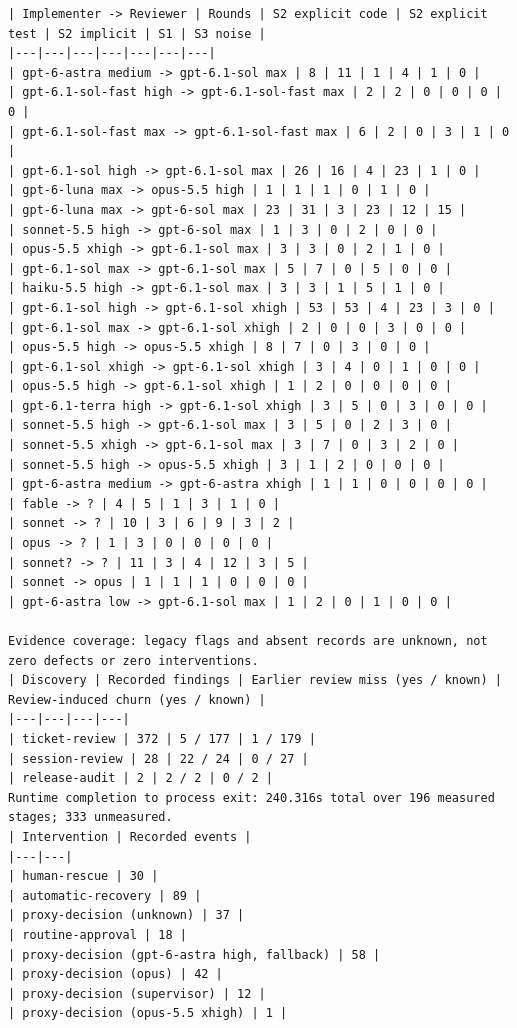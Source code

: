 \documentclass[11pt,a4paper]{article}
\begin{document}
{\begin{verbatim}
| Implementer -> Reviewer | Rounds | S2 explicit code | S2 explicit test | S2 implicit | S1 | S3 noise |
|---|---|---|---|---|---|---|
| gpt-6-astra medium -> gpt-6.1-sol max | 8 | 11 | 1 | 4 | 1 | 0 |
| gpt-6.1-sol-fast high -> gpt-6.1-sol-fast max | 2 | 2 | 0 | 0 | 0 | 0 |
| gpt-6.1-sol-fast max -> gpt-6.1-sol-fast max | 6 | 2 | 0 | 3 | 1 | 0 |
| gpt-6.1-sol high -> gpt-6.1-sol max | 26 | 16 | 4 | 23 | 1 | 0 |
| gpt-6-luna max -> opus-5.5 high | 1 | 1 | 1 | 0 | 1 | 0 |
| gpt-6-luna max -> gpt-6-sol max | 23 | 31 | 3 | 23 | 12 | 15 |
| sonnet-5.5 high -> gpt-6-sol max | 1 | 3 | 0 | 2 | 0 | 0 |
| opus-5.5 xhigh -> gpt-6.1-sol max | 3 | 3 | 0 | 2 | 1 | 0 |
| gpt-6.1-sol max -> gpt-6.1-sol max | 5 | 7 | 0 | 5 | 0 | 0 |
| haiku-5.5 high -> gpt-6.1-sol max | 3 | 3 | 1 | 5 | 1 | 0 |
| gpt-6.1-sol high -> gpt-6.1-sol xhigh | 53 | 53 | 4 | 23 | 3 | 0 |
| gpt-6.1-sol max -> gpt-6.1-sol xhigh | 2 | 0 | 0 | 3 | 0 | 0 |
| opus-5.5 high -> opus-5.5 xhigh | 8 | 7 | 0 | 3 | 0 | 0 |
| gpt-6.1-sol xhigh -> gpt-6.1-sol xhigh | 3 | 4 | 0 | 1 | 0 | 0 |
| opus-5.5 high -> gpt-6.1-sol xhigh | 1 | 2 | 0 | 0 | 0 | 0 |
| gpt-6.1-terra high -> gpt-6.1-sol xhigh | 3 | 5 | 0 | 3 | 0 | 0 |
| sonnet-5.5 high -> gpt-6.1-sol max | 3 | 5 | 0 | 2 | 3 | 0 |
| sonnet-5.5 xhigh -> gpt-6.1-sol max | 3 | 7 | 0 | 3 | 2 | 0 |
| sonnet-5.5 high -> opus-5.5 xhigh | 3 | 1 | 2 | 0 | 0 | 0 |
| gpt-6-astra medium -> gpt-6-astra xhigh | 1 | 1 | 0 | 0 | 0 | 0 |
| fable -> ? | 4 | 5 | 1 | 3 | 1 | 0 |
| sonnet -> ? | 10 | 3 | 6 | 9 | 3 | 2 |
| opus -> ? | 1 | 3 | 0 | 0 | 0 | 0 |
| sonnet? -> ? | 11 | 3 | 4 | 12 | 3 | 5 |
| sonnet -> opus | 1 | 1 | 1 | 0 | 0 | 0 |
| gpt-6-astra low -> gpt-6.1-sol max | 1 | 2 | 0 | 1 | 0 | 0 |

Evidence coverage: legacy flags and absent records are unknown, not zero defects or zero interventions.
| Discovery | Recorded findings | Earlier review miss (yes / known) | Review-induced churn (yes / known) |
|---|---|---|---|
| ticket-review | 372 | 5 / 177 | 1 / 179 |
| session-review | 28 | 22 / 24 | 0 / 27 |
| release-audit | 2 | 2 / 2 | 0 / 2 |
Runtime completion to process exit: 240.316s total over 196 measured stages; 333 unmeasured.
| Intervention | Recorded events |
|---|---|
| human-rescue | 30 |
| automatic-recovery | 89 |
| proxy-decision (unknown) | 37 |
| routine-approval | 18 |
| proxy-decision (gpt-6-astra high, fallback) | 58 |
| proxy-decision (opus) | 42 |
| proxy-decision (supervisor) | 12 |
| proxy-decision (opus-5.5 xhigh) | 1 |
\end{verbatim}
}
\end{document}
